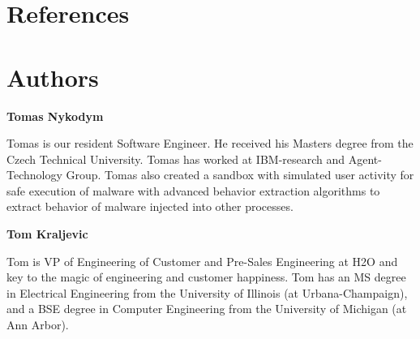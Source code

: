 

\newpage

\section{References}
  














\newpage

\section{Authors}

\textbf{Tomas Nykodym}

Tomas is our resident Software Engineer. He received his Masters degree from the Czech Technical University. Tomas has worked at IBM-research and Agent-Technology Group. Tomas also created a sandbox with simulated user activity for safe execution of malware with advanced behavior extraction algorithms to extract behavior of malware injected into other processes. 

\textbf{Tom Kraljevic}

Tom is VP of Engineering of Customer and Pre-Sales Engineering at H2O and key to the magic of engineering and customer happiness. Tom has an MS degree in Electrical Engineering from the University of Illinois (at Urbana-Champaign), and a BSE degree in Computer Engineering from the University of Michigan (at Ann Arbor).


